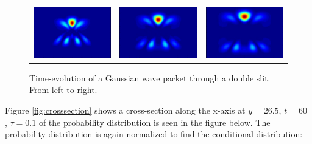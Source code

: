 \begin{figure}[H]
\begin{tabular}{ccc}
  \includegraphics[scale = 0.29]{slit10.png} &   \includegraphics[scale = 0.29]{slit11.png} &   \includegraphics[scale = 0.29]{slit12.png} \\
\end{tabular}
\caption{Time-evolution of a Gaussian wave packet through a double slit. From left to right.}
\end{figure} Figure \ref{fig:crosssection} shows a cross-section along the x-axis at $y = 26.5$, $t = 60$ , $\tau = 0.1$ of the probability distribution is seen in the figure below. The probability distribution is again normalized to find the conditional distribution:

